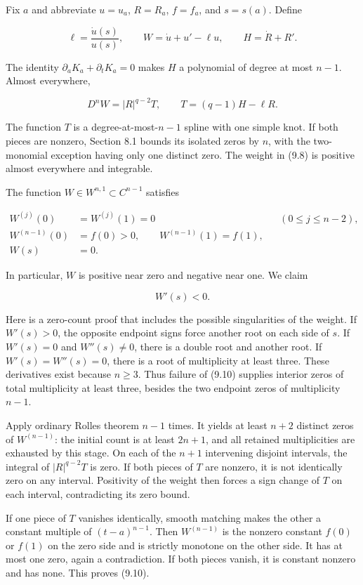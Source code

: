 \documentclass[11pt]{article}
\begin{document}
Fix \(a\) and abbreviate \(u=u_a\), \(R=R_a\), \(f=f_a\), and
\(s=s(a)\). Define

\[
\ell=\frac{\dot u(s)}{u(s)},\qquad
W=\dot u+u'-\ell u,\qquad H=\dot R+R'.
\tag{9.7}
\]

The identity \(\partial_aK_a+\partial_tK_a=0\) makes \(H\) a polynomial
of degree at most \(n-1\). Almost everywhere,

\[
D^nW=|R|^{q-2}T,\qquad T=(q-1)H-\ell R.
\tag{9.8}
\]

The function \(T\) is a degree-at-most-\(n-1\) spline with one simple
knot. If both pieces are nonzero, Section 8.1 bounds its isolated zeros
by \(n\), with the two-monomial exception having only one distinct zero.
The weight in (9.8) is positive almost everywhere and integrable.

The function \(W\in W^{n,1}\subset C^{n-1}\) satisfies

\[
\begin{aligned}
W^{(j)}(0)&=W^{(j)}(1)=0 &&(0\le j\le n-2),\\
W^{(n-1)}(0)&=f(0)>0,\qquad W^{(n-1)}(1)=f(1),\\
W(s)&=0.
\end{aligned}
\tag{9.9}
\]

In particular, \(W\) is positive near zero and negative near one. We
claim

\[
W'(s)<0.
\tag{9.10}
\]

Here is a zero-count proof that includes the possible singularities of
the weight. If \(W'(s)>0\), the opposite endpoint signs force another
root on each side of \(s\). If \(W'(s)=0\) and \(W''(s)\ne0\), there is
a double root and another root. If \(W'(s)=W''(s)=0\), there is a root
of multiplicity at least three. These derivatives exist because
\(n\ge3\). Thus failure of (9.10) supplies interior zeros of total
multiplicity at least three, besides the two endpoint zeros of
multiplicity \(n-1\).

Apply ordinary Rolle\textquotesingle s theorem \(n-1\) times. It yields
at least \(n+2\) distinct zeros of \(W^{(n-1)}\): the initial count is
at least \(2n+1\), and all retained multiplicities are exhausted by this
stage. On each of the \(n+1\) intervening disjoint intervals, the
integral of \(|R|^{q-2}T\) is zero. If both pieces of \(T\) are nonzero,
it is not identically zero on any interval. Positivity of the weight
then forces a sign change of \(T\) on each interval, contradicting its
zero bound.

If one piece of \(T\) vanishes identically, smooth matching makes the
other a constant multiple of \((t-a)^{n-1}\). Then \(W^{(n-1)}\) is the
nonzero constant \(f(0)\) or \(f(1)\) on the zero side and is strictly
monotone on the other side. It has at most one zero, again a
contradiction. If both pieces vanish, it is constant nonzero and has
none. This proves (9.10).
\end{document}
